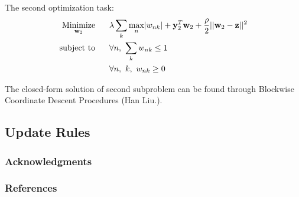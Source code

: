 \documentclass{article} %
\newcommand{\LTwoNorm}[1]{||#1||^{2}}
\newcommand{\sumk}{\sum_{k}}
\newcommand{\wnk}{w_{nk}}
\newcommand{\wtwo}{\mathbf{w}_2}
\newcommand{\w}{\mathbf{w}}
\newcommand{\maxn}{ \underset{n}{\text{max}} }
\newcommand{\z}{\mathbf{z}}
\newcommand{\quadraterm}[1]{\frac{\rho}{2}\LTwoNorm{\w_{#1}-\z}}
\newcommand{\minimize}[1]{ \underset{#1}{\text{Minimize}} }
\newcommand{\subjectto}{ \text{subject to} }
\newcommand{\hs}{\hspace*{0.6cm}}
\begin{document}
 The second optimization task:
\begin{align}
   \minimize{\wtwo}
   \hs & \lambda \sumk \maxn | \wnk |  %
   + \mutw{2} + \quadraterm{2}  \\
   \subjectto  
   \hs & \forall n,\ \sumk \wnk \leq 1 \\
   \hs & \forall n,\ k,\ \wnk \geq 0
 \end{align} 

 The closed-form solution of second subproblem can be found through Blockwise
 Coordinate Descent Procedures (Han Liu.).


\subsection{Update Rules}



\subsubsection*{Acknowledgments}

\subsubsection*{References}
\small{

}
\end{document}
